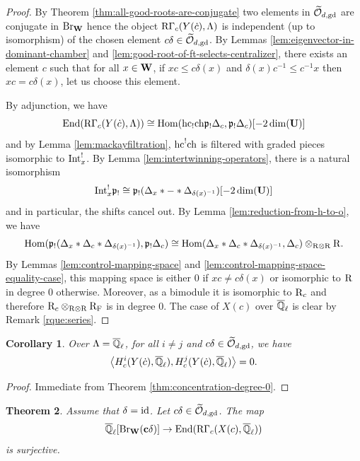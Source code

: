 \documentclass[article, 10pt, oneside, reqno]{amsart}
\theoremstyle{plain}
\newtheorem{thm}{Theorem}[subsection]
\newtheorem{corol}[thm]{Corollary}
\theoremstyle{definition}
\theoremstyle{remark}
\newcommand{\gd}{\mathrm{gd}}
\newcommand{\cbf}{\mathbf{c}}
\begin{document}
\begin{proof}
By Theorem \ref{thm:all-good-roots-are-conjugate} two elements in $\widetilde{\Ocal}_{d,\gd}$ are conjugate in $\mathrm{Br}_{\mathbf{W}}$ hence the object $\mathrm{R\Gamma}_c(Y(\dot{c}), \Lambda)$ is independent (up to isomorphism) of the chosen element $c\delta \in \widetilde{\Ocal}_{d,\gd}$. By Lemmas \ref{lem:eigenvector-in-dominant-chamber} and \ref{lem:good-root-of-ft-selects-centralizer}, there exists an element $c$ such that for all $x \in \mathbf{W}$, if $xc \leq c\delta(x)$ and $\delta(x)c^{-1} \leq c^{-1}x$ then $xc = c\delta(x)$, let us choose this element. 

By adjunction, we have 
$$\mathrm{End}(\mathrm{R\Gamma}_c(Y(\dot{c}), \Lambda)) \cong \mathrm{Hom}(\mathrm{hc}_!\mathrm{ch} \mathfrak{p}_!\Delta_c, \mathfrak{p}_!\Delta_c)[-2\dim(\mathbf{U})]$$
and by Lemma \ref{lem:mackayfiltration}, $\mathrm{hc}^!\mathrm{ch}$ is filtered with graded pieces isomorphic to $\mathrm{Int}_x^!$. By Lemma \ref{lem:intertwinning-operators}, there is a natural isomorphism
\[\mathrm{Int}_x^! \mathfrak{p}_! \cong \mathfrak{p}_!(\Delta_x * - * \Delta_{\delta(x)^{-1}})[-2\dim(\mathbf{U})]\]
and in particular, the shifts cancel out. By Lemma \ref{lem:reduction-from-h-to-o}, we have 
$$\mathrm{Hom}(\mathfrak{p}_!(\Delta_x * \Delta_c * \Delta_{\delta(x)^{-1}}), \mathfrak{p}_! \Delta_c) \cong \mathrm{Hom}(\Delta_x * \Delta_c * \Delta_{\delta(x)^{-1}}, \Delta_c) \otimes_{\mathrm{R} \otimes \mathrm{R}} \mathrm{R}.$$
By Lemmas \ref{lem:control-mapping-space} and \ref{lem:control-mapping-space-equality-case}, this mapping space is either $0$ if $xc \neq c\delta(x)$ or isomorphic to $\mathrm{R}$ in degree $0$ otherwise. Moreover, as a bimodule it is isomorphic to $\mathrm{R}_c$ and therefore $\mathrm{R}_c \otimes_{\mathrm{R} \otimes \mathrm{R}} \mathrm{R}_{\mathrm{F}}$ is in degree $0$. The case of $X(c)$ over $\overline{\mathbb{Q}}_{\ell}$ is clear by Remark \ref{rque:series}.
\end{proof}

\begin{corol}
Over $\Lambda = \overline{\mathbb{Q}}_{\ell}$, for all $i \neq j$ and $c\delta \in \widetilde{\Ocal}_{d,\gd}$, we have 
$$\left\langle H^i_c(Y(\dot{c}), \overline{\mathbb{Q}}_{\ell}), H^j_c(Y(\dot{c}), \overline{\mathbb{Q}}_{\ell}) \right\rangle = 0.$$
\end{corol}

\begin{proof}
Immediate from Theorem \ref{thm:concentration-degree-0}.
\end{proof}

\begin{thm}\label{thm:surjectivity}
Assume that $\delta = \mathrm{id}$. Let $c\delta \in \widetilde{\Ocal}_{d, \gd}$. The map 
$$\Qlb[\Br_{\Wbf}(\cbf\delta)] \to \End(\RGamma_c(X(c), \Qlb))$$
is surjective. 
\end{thm}
\end{document}
